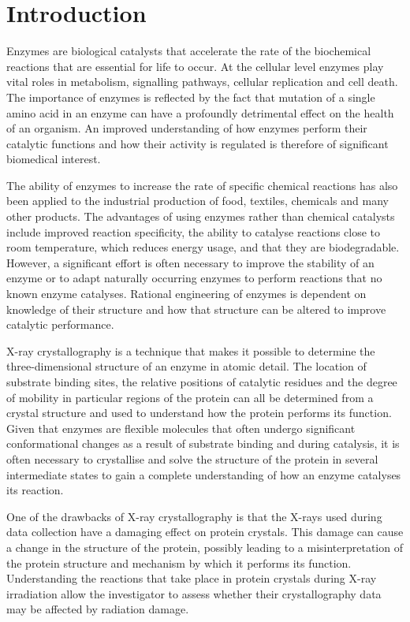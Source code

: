 \chapter{Introduction}\label{ch:Intro}
Enzymes are biological catalysts that accelerate the rate of the biochemical reactions that are essential for life to occur. At the cellular level enzymes play vital roles in metabolism, signalling pathways, cellular replication and cell death. The importance of enzymes is reflected by the fact that mutation of a single amino acid in an enzyme can have a profoundly detrimental effect on the health of an organism. An improved understanding of how enzymes perform their catalytic functions and how their activity is regulated is therefore of significant biomedical interest. 

The ability of enzymes to increase the rate of specific chemical reactions has also been applied to the industrial production of food, textiles, chemicals and many other products. The advantages of using enzymes rather than chemical catalysts include improved reaction specificity, the ability to catalyse reactions close to room temperature, which reduces energy usage, and that they are biodegradable. However, a significant effort is often necessary to improve the stability of an enzyme or to adapt naturally occurring enzymes to perform reactions that no known enzyme catalyses. Rational engineering of enzymes is dependent on knowledge of their structure and how that structure can be altered to improve catalytic performance. %

X-ray crystallography is a technique that makes it possible to determine the three-dimensional structure of an enzyme in atomic detail. The location of substrate binding sites, the relative positions of catalytic residues and the degree of mobility in particular regions of the protein can all be determined from a crystal structure and used to understand how the protein performs its function. Given that enzymes are flexible molecules that often undergo significant conformational changes as a result of substrate binding and during catalysis, it is often necessary to crystallise and solve the structure of the protein in several intermediate states to gain a complete understanding of how an enzyme catalyses its reaction. 

One of the drawbacks of X-ray crystallography is that the X-rays used during data collection have a damaging effect on protein crystals. This damage can cause a change in the structure of the protein, possibly leading to a misinterpretation of the protein structure and mechanism by which it performs its function. Understanding the reactions that take place in protein crystals during X-ray irradiation allow the investigator to assess whether their crystallography data may be affected by radiation damage.

